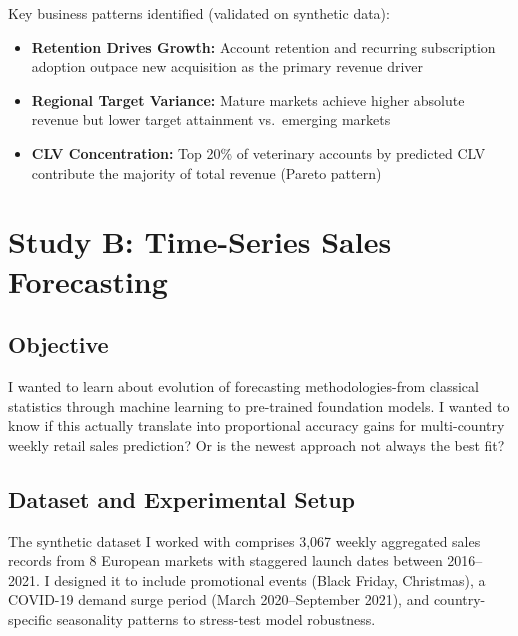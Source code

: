 \documentclass[11pt,a4paper]{article}
\begin{document}
Key business patterns identified (validated on synthetic data):
\begin{itemize}[leftmargin=*,noitemsep,topsep=2pt]
    \item \textbf{Retention Drives Growth:} Account retention and recurring subscription adoption outpace new acquisition as the primary revenue driver
    \item \textbf{Regional Target Variance:} Mature markets achieve higher absolute revenue but lower target attainment vs.\ emerging markets
    \item \textbf{CLV Concentration:} Top 20\% of veterinary accounts by predicted CLV contribute the majority of total revenue (Pareto pattern)
\end{itemize}

\section{Study B: Time-Series Sales Forecasting}

\subsection{Objective}
I wanted to learn about evolution of forecasting methodologies-from classical statistics through machine learning to pre-trained foundation models. I wanted to know if this actually translate into proportional accuracy gains for multi-country weekly retail sales prediction? Or is the newest approach not always the best fit?

\subsection{Dataset and Experimental Setup}
The synthetic dataset I worked with comprises 3,067 weekly aggregated sales records from 8 European markets with staggered launch dates between 2016--2021. I designed it to include promotional events (Black Friday, Christmas), a COVID-19 demand surge period (March 2020--September 2021), and country-specific seasonality patterns to stress-test model robustness.
\end{document}
